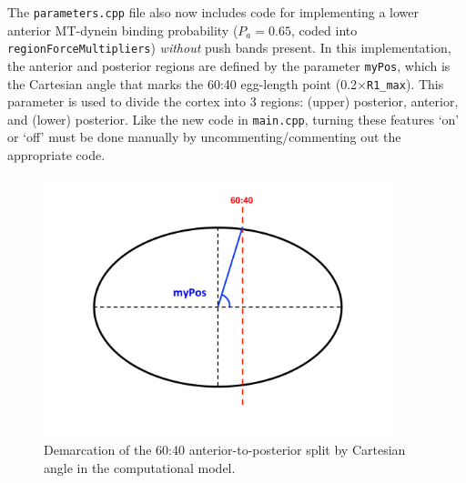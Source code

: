 \documentclass{article}
\begin{document}
The \texttt{parameters.cpp} file also now includes code for implementing a lower anterior MT-dynein binding probability ($P_a = 0.65$, coded into \texttt{regionForceMultipliers}) \emph{without} push bands present. In this implementation, the anterior and posterior regions are defined by the parameter \texttt{myPos}, which is the Cartesian angle that marks the 60:40 egg-length point (0.2$\times$\texttt{R1\_max}). This parameter is used to divide the cortex into 3 regions: (upper) posterior, anterior, and (lower) posterior. Like the new code in \texttt{main.cpp}, turning these features `on' or `off' must be done manually by uncommenting/commenting out the appropriate code.

\begin{figure}[H]
\centering
\includegraphics[width=0.9\textwidth]{figures/APsetup.pdf}
\caption{Demarcation of the 60:40 anterior-to-posterior split by Cartesian angle in the computational model.}
\label{divplane}
\end{figure}
\end{document}
